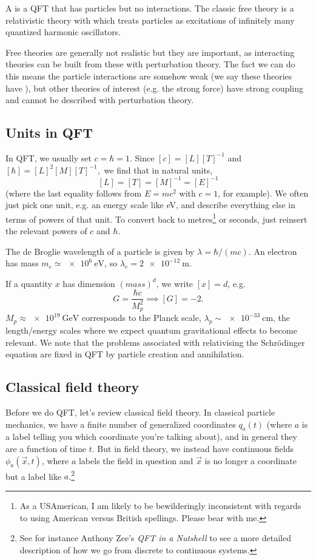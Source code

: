 \begin{defn}
A  is a QFT that has particles but no interactions. The classic free theory is a relativistic theory with which treats particles as excitations of infinitely many quantized harmonic oscillators.
\end{defn}
Free theories are generally not realistic but they are important, as interacting theories can be built from these with perturbation theory. The fact we can do this means the particle interactions are somehow weak (we say these theories have ), but other theories of interest (e.g. the strong force) have strong coupling and cannot be described with perturbation theory.

\subsection*{Units in QFT} In QFT, we usually set $c=\hbar=1$. Since $[c]=[L][T]^{-1}$ and $[\hbar]=[L]^2[M][T]^{-1},$ we find that in natural units, $$[L]=[T]=[M]^{-1}=[E]^{-1}$$ (where the last equality follows from $E=mc^2$ with $c=1$, for example). We often just pick one unit, e.g. an energy scale like \si{\electronvolt}, and describe everything else in terms of powers of that unit. To convert back to metres\footnote{As a USAmerican, I am likely to be bewilderingly inconsistent with regards to using American versus British spellings. Please bear with me.} or seconds, just reinsert the relevant powers of $c$ and $\hbar$.

\begin{exm}
The de Broglie wavelength of a particle is given by $\lambda=\hbar/(mc)$. An electron has mass $m_e\simeq \SI{e6}{\electronvolt}$, so $\lambda_e = \SI{2e-12}{\meter}$.
\end{exm}

If a quantity $x$ has dimension $(mass)^d$, we write $[x]=d$, e.g. $$G=\frac{\hbar c}{M_p^2}\implies [G]=-2.$$  $M_p \approx \SI{e19}{\giga\electronvolt}$ corresponds to the Planck scale, $\lambda_p \sim \SI{e-33}{\centi\meter}$, the length/energy scales where we expect quantum gravitational effects to become relevant. We note that the problems associated with relativising the Schr\"odinger equation are fixed in QFT by particle creation and annihilation.

\subsection*{Classical field theory} Before we do QFT, let's review classical field theory. In classical particle mechanics, we have a finite number of generalized coordinates $q_a(t)$ (where $a$ is a label telling you which coordinate you're talking about), and in general they are a function of time $t$. But in field theory, we instead have continuous fields $\phi_a(\vec{x},t)$, where $a$ labels the field in question and $\vec x$ is no longer a coordinate but a label like $a$.\footnote{See for instance Anthony Zee's \textit{QFT in a Nutshell} to see a more detailed description of how we go from discrete to continuous systems.}

